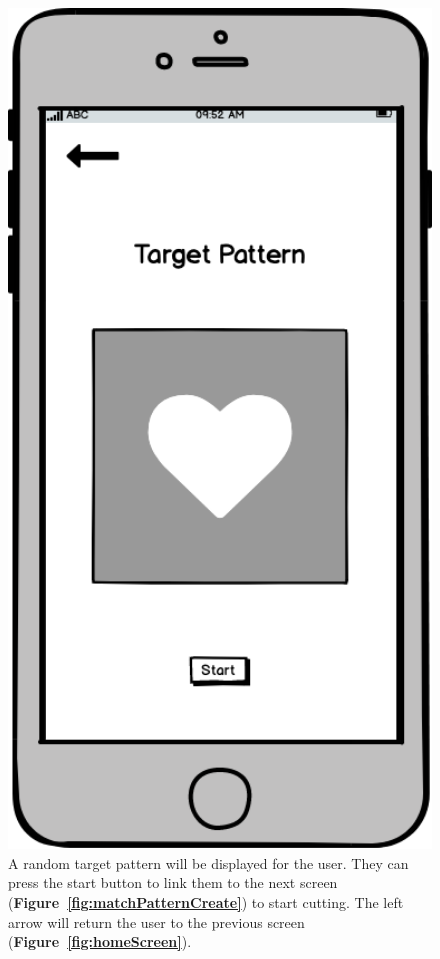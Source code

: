 \documentclass[11pt]{article}
\begin{document}
           \begin{figure}
                \begin{minipage}[c]{0.35\textwidth}
                \includegraphics[width=1\textwidth]{Images/Prototype/prototypeTarget.png}
                \end{minipage}\hfill
                \begin{minipage}[c]{0.65\textwidth}
                \caption{A random target pattern will be displayed for the user. They can press the start button to link them to the next screen (\textbf{Figure~\ref{fig:matchPatternCreate}}) to start cutting. The left arrow will return the user to the previous screen (\textbf{Figure~\ref{fig:homeScreen}}).}
                \label{fig:target}
                \end{minipage}
            \end{figure}
                           
\end{document}
